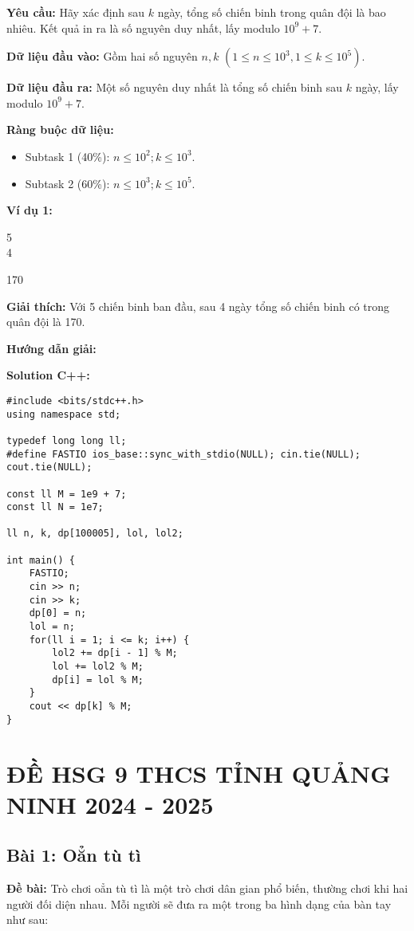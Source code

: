 \documentclass[12pt]{scrartcl}  %
\begin{document}
\textbf{Yêu cầu:}
Hãy xác định sau $k$ ngày, tổng số chiến binh trong quân đội là bao nhiêu.
Kết quả in ra là số nguyên duy nhất, lấy modulo $10^9 + 7$.

\textbf{Dữ liệu đầu vào:}
Gồm hai số nguyên $n, k$ $(1 \leq n \leq 10^3, 1 \leq k \leq 10^5)$.

\textbf{Dữ liệu đầu ra:}
Một số nguyên duy nhất là tổng số chiến binh sau $k$ ngày, lấy modulo $10^9 + 7$.

\textbf{Ràng buộc dữ liệu:}
\begin{itemize}
    \item Subtask 1 (40\%): $n \leq 10^2; k \leq 10^3$.
    \item Subtask 2 (60\%): $n \leq 10^3; k \leq 10^5$.
\end{itemize}

\textbf{Ví dụ 1:}
\begin{tcolorbox}[colback=gray!5!white, colframe=blue!50!black, title=Input]
5\\
4
\end{tcolorbox}
\begin{tcolorbox}[colback=gray!5!white, colframe=green!50!black, title=Output]
170
\end{tcolorbox}

\textbf{Giải thích:}
Với 5 chiến binh ban đầu, sau 4 ngày tổng
số chiến binh có trong quân đội là 170.

\textbf{Hướng dẫn giải:}

\textbf{Solution C++:}
\begin{lstlisting}
#include <bits/stdc++.h>
using namespace std;

typedef long long ll;
#define FASTIO ios_base::sync_with_stdio(NULL); cin.tie(NULL); cout.tie(NULL);

const ll M = 1e9 + 7;
const ll N = 1e7;

ll n, k, dp[100005], lol, lol2;

int main() {
    FASTIO;
    cin >> n;
    cin >> k;
    dp[0] = n;
    lol = n;
    for(ll i = 1; i <= k; i++) {
        lol2 += dp[i - 1] % M;
        lol += lol2 % M;
        dp[i] = lol % M;
    }
    cout << dp[k] % M;
}

\end{lstlisting}

\section{ĐỀ HSG 9 THCS TỈNH QUẢNG NINH 2024 - 2025}

\subsection{Bài 1: Oẳn tù tì}
\textbf{Đề bài:}
Trò chơi oẳn tù tì là một trò chơi dân gian phổ biến, thường chơi khi hai người đối diện nhau. Mỗi người sẽ đưa ra một trong ba hình dạng của bàn tay như sau:
\end{document}
